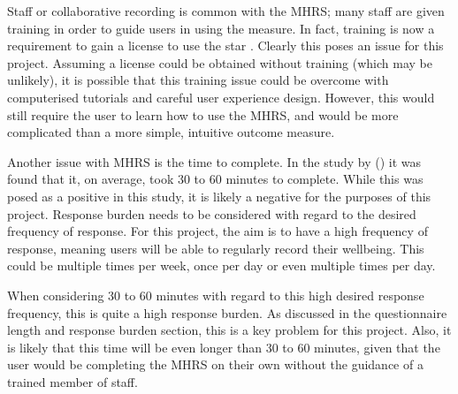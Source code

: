 \documentclass[11pt,openright,a4paper]{report}
\begin{document}
Staff or collaborative recording is common with the MHRS; many staff are given training in order to guide users in using the measure. In fact, training is now a requirement to gain a license to use the star \parencite{starlicense}. Clearly this poses an issue for this project. Assuming a license could be obtained without training (which may be unlikely), it is possible that this training issue could be overcome with computerised tutorials and careful user experience design. However, this would still require the user to learn how to use the MHRS, and would be more complicated than a more simple, intuitive outcome measure.

Another issue with MHRS is the time to complete. In the study by \citeauthor{killaspy2012psychometric} (\citeyear{killaspy2012psychometric}) it was found that it, on average, took 30 to 60 minutes to complete. While this was posed as a positive in this study, it is likely a negative for the purposes of this project. Response burden needs to be considered with regard to the desired frequency of response. For this project, the aim is to have a high frequency of response, meaning users will be able to regularly record their wellbeing. This could be multiple times per week, once per day or even multiple times per day.

When considering 30 to 60 minutes with regard to this high desired response frequency, this is quite a high response burden. As discussed in the questionnaire length and response burden section, this is a key problem for this project. Also, it is likely that this time will be even longer than 30 to 60 minutes, given that the user would be completing the MHRS on their own without the guidance of a trained member of staff.
\end{document}
